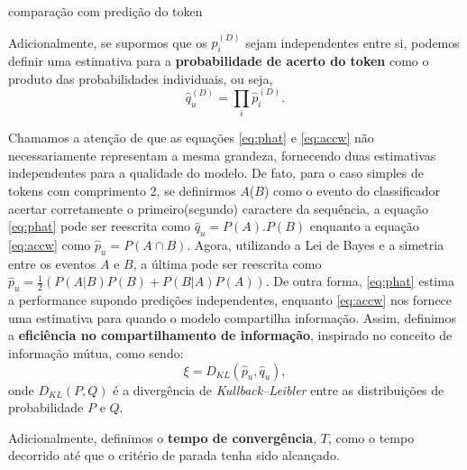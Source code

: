 comparação com predição do token

 Adicionalmente, se supormos que os $\hat{p}_i^{(D)}$ sejam independentes entre si, podemos definir uma estimativa para a \textbf{probabilidade de acerto do token} como o produto das probabilidades individuais, ou seja,
\begin{equation} \label{eq:phat}
	\hat{q}_u^{(D)} = \prod_{i} \hat{p}_i^{(D)}.
\end{equation}

Chamamos a atenção de que as equações \ref{eq:phat} e \ref{eq:accw} não necessariamente representam a mesma grandeza, fornecendo duas estimativas independentes para a qualidade do modelo. De fato, para o caso simples de tokens com comprimento 2, se definirmos $A$($B$) como o evento do classificador acertar corretamente o primeiro(segundo) caractere da sequência, a equação \ref{eq:phat} pode ser reescrita como $\hat{q}_u = P(A).P(B)$ enquanto a equação \ref{eq:accw} como $\hat{p}_u = P(A \cap B)$. Agora, utilizando a Lei de Bayes e a simetria entre os eventos $A$ e $B$, a última pode ser reescrita como $\hat{p}_u = \frac{1}{2} (P(A | B) P(B) + P(B|A)P(A))$. De outra forma, \ref{eq:phat} estima a performance supondo predições independentes, enquanto \ref{eq:accw} nos fornece uma estimativa para quando o modelo compartilha informação. Assim, definimos a \textbf{eficiência no compartilhamento de informação}, inspirado no conceito de informação mútua, como sendo: 
\begin{equation} \label{eq:sharing_efficiency}
\xi = D_{KL}(\hat{p}_u, \hat{q}_u),
\end{equation}
onde $D_{KL}(P, Q)$ é a divergência de \textit{Kullback–Leibler} entre as distribuições de probabilidade $P$ e $Q$.


 Adicionalmente, definimos o \textbf{tempo de convergência}, $T$, como o tempo decorrido até que o critério de parada tenha sido alcançado.
